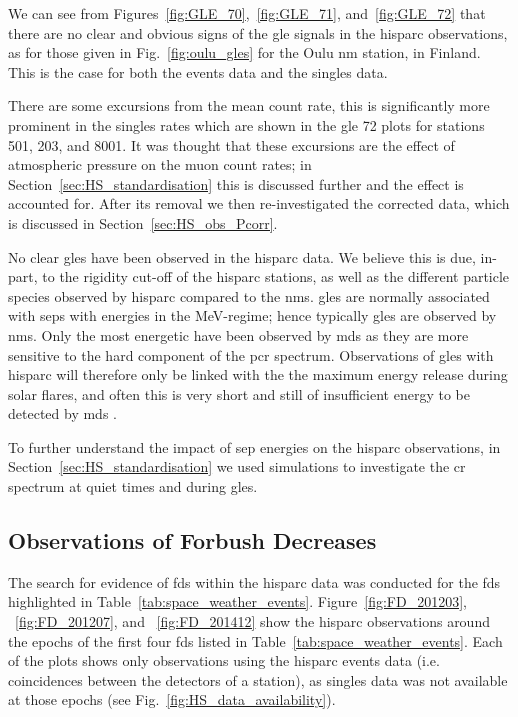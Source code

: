 We can see from Figures~\ref{fig:GLE_70},~\ref{fig:GLE_71}, and~\ref{fig:GLE_72} that there are no clear and obvious signs of the \gls{gle} signals in the \gls{hisparc} observations, as for those given in Fig.~\ref{fig:oulu_gles} for the Oulu \gls{nm} station, in Finland. This is the case for both the events data and the singles data.

There are some excursions from the mean count rate, this is significantly more prominent in the singles rates which are shown in the \gls{gle} 72 plots for stations 501, 203, and 8001. It was thought that these excursions are the effect of atmospheric pressure on the muon count rates; in Section~\ref{sec:HS_standardisation} this is discussed further and the effect is accounted for. After its removal we then re-investigated the corrected data, which is discussed in Section~\ref{sec:HS_obs_Pcorr}.

No clear \glspl{gle} have been observed in the \gls{hisparc} data. We believe this is due, in-part, to the rigidity cut-off of the \gls{hisparc} stations, as well as the different particle species observed by \gls{hisparc} compared to the \glspl{nm}. \glspl{gle} are normally associated with \glspl{sep} with energies in the MeV-regime; hence typically \glspl{gle} are observed by \glspl{nm}. Only the most energetic have been observed by \glspl{md} as they are more sensitive to the hard component of the \gls{pcr} spectrum. Observations of \glspl{gle} with \gls{hisparc} will therefore only be linked with the the maximum energy release during solar flares, and often this is very short and still of insufficient energy to be detected by \glspl{md} \citep{mccracken_high-energy_2012, augusto_signals_2016}. 

To further understand the impact of \gls{sep} energies on the \gls{hisparc} observations, in Section~\ref{sec:HS_standardisation} we used simulations to investigate the \gls{cr} spectrum at quiet times and during \glspl{gle}. %


\subsection{Observations of Forbush Decreases}


The search for evidence of \glspl{fd} within the \gls{hisparc} data was conducted for the \glspl{fd} highlighted in Table~\ref{tab:space_weather_events}. Figure~\ref{fig:FD_201203}, ~\ref{fig:FD_201207}, and ~\ref{fig:FD_201412} show the \gls{hisparc} observations around the epochs of the first four \glspl{fd} listed in Table~\ref{tab:space_weather_events}. Each of the plots shows only observations using the \gls{hisparc} events data (i.e. coincidences between the detectors of a station), as singles data was not available at those epochs (see Fig.~\ref{fig:HS_data_availability}).

